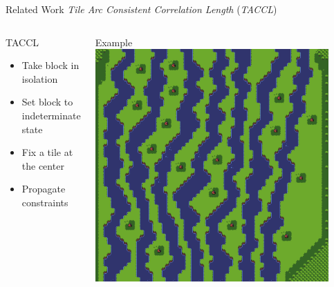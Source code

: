 \documentclass{beamer}
\begin{document}
  \begin{frame}[fragile]{Related Work}
    \textit{Tile Arc Consistent Correlation Length} (\textit{TACCL})
    \begin{columns}[T,onlytextwidth]
        \begin{block}{TACCL}
          \hfill \\
          \begin{itemize}
            \item Take block in isolation
            \item Set block to indeterminate state
            \item Fix a tile at the center
            \item Propagate constraints
          \end{itemize}
        \end{block}
        \begin{block}{Example}
          \includegraphics[width=0.9\textwidth]{img/forestmicro_64x64.pdf}
        \end{block}
    \end{columns}
  \end{frame}
\end{document}
